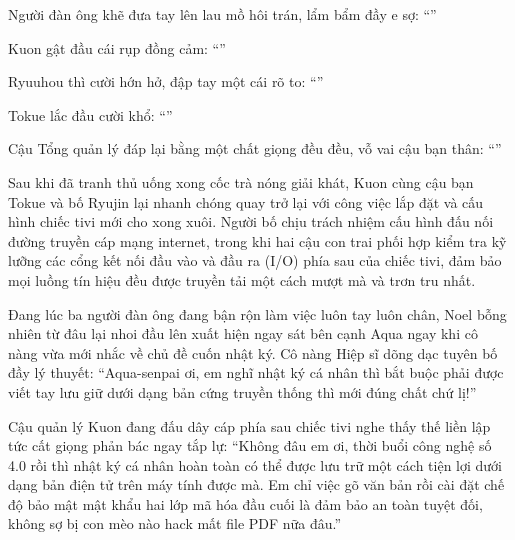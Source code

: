 \documentclass[../main.tex]{subfiles}
\begin{document}
Người đàn ông khẽ đưa tay lên lau mồ hôi trán, lẩm bẩm đầy e sợ: ``''

Kuon gật đầu cái rụp đồng cảm: ``''

Ryuuhou thì cười hớn hở, đập tay một cái rõ to: ``''

Tokue lắc đầu cười khổ: ``''

Cậu Tổng quản lý đáp lại bằng một chất giọng đều đều, vỗ vai cậu bạn thân: ``''

\ct

Sau khi đã tranh thủ uống xong cốc trà nóng giải khát, Kuon cùng cậu bạn Tokue và bố Ryujin lại nhanh chóng quay trở lại với công việc lắp đặt và cấu hình chiếc tivi mới cho xong xuôi. Người bố chịu trách nhiệm cấu hình đấu nối đường truyền cáp mạng internet, trong khi hai cậu con trai phối hợp kiểm tra kỹ lưỡng các cổng kết nối đầu vào và đầu ra (I/O) phía sau của chiếc tivi, đảm bảo mọi luồng tín hiệu đều được truyền tải một cách mượt mà và trơn tru nhất.

Đang lúc ba người đàn ông đang bận rộn làm việc luôn tay luôn chân, Noel bỗng nhiên từ đâu lại nhoi đầu lên xuất hiện ngay sát bên cạnh Aqua ngay khi cô nàng vừa mới nhắc về chủ đề cuốn nhật ký. Cô nàng Hiệp sĩ dõng dạc tuyên bố đầy lý thuyết: ``Aqua-senpai ơi, em nghĩ nhật ký cá nhân thì bắt buộc phải được viết tay lưu giữ dưới dạng bản cứng truyền thống thì mới đúng chất chứ lị!''


Cậu quản lý Kuon đang đấu dây cáp phía sau chiếc tivi nghe thấy thế liền lập tức cất giọng phản bác ngay tắp lự: ``Không đâu em ơi, thời buổi công nghệ số 4.0 rồi thì nhật ký cá nhân hoàn toàn có thể được lưu trữ một cách tiện lợi dưới dạng bản điện tử trên máy tính được mà. Em chỉ việc gõ văn bản rồi cài đặt chế độ bảo mật mật khẩu hai lớp mã hóa đầu cuối là đảm bảo an toàn tuyệt đối, không sợ bị con mèo nào hack mất file PDF nữa đâu.''
\end{document}
